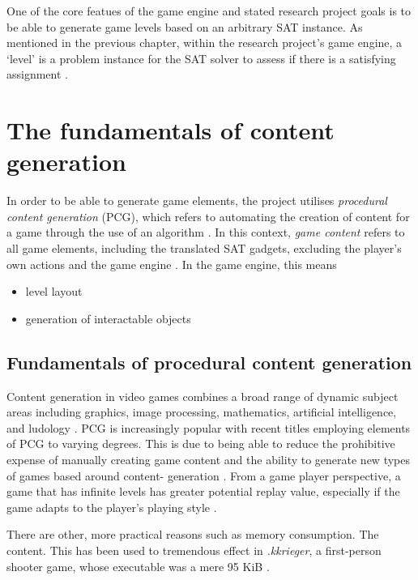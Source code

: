 \documentclass[11pt, a4paper, oneside]{report} %
\begin{document}
One of the core featues of the game engine and stated research project goals is
to be able to generate game levels based on an arbitrary SAT instance. As
mentioned in the previous chapter, within the research project's game engine, a
`level' is a problem instance for the SAT solver to assess if there is a
satisfying assignment \cite{Aloupis2012} .

\section{The fundamentals of content generation}

In order to be able to generate game elements, the project utilises
\textit{procedural content generation} (PCG), which refers to automating the
creation of content for a game through the use of an algorithm
\cite{Hendrikx:2013:PCG:2422956.2422957, 5756645}. In this context, \textit{game
content} refers to all game elements, including the translated SAT gadgets,
excluding the player's own actions and the game engine \cite{Burgun:2012}. In
the game engine, this means

\begin{itemize}
\item level layout
\item generation of interactable objects
\end{itemize}

\subsection{Fundamentals of procedural content generation}

Content generation in video games combines a broad range of dynamic subject
areas including graphics, image processing, mathematics, artificial
intelligence, and ludology \cite{Hendrikx:2013:PCG:2422956.2422957}. PCG is
increasingly popular with recent titles employing elements of PCG to varying
degrees. This is due to being able to reduce the prohibitive expense of manually
creating game content \cite{Hendrikx:2013:PCG:2422956.2422957} and the ability
to generate new types of games based around content- generation \cite{5756645}.
From a game player perspective, a game that has infinite levels has greater
potential replay value, especially if the game adapts to the player's playing
style \cite{6424299}.

There are other, more practical reasons such as memory
consumption. The content. This has been used to tremendous effect in \textit{.kkrieger}, a
first-person shooter game, whose executable was a mere 95 KiB
\cite{Hendrikx:2013:PCG:2422956.2422957}.
\end{document}
